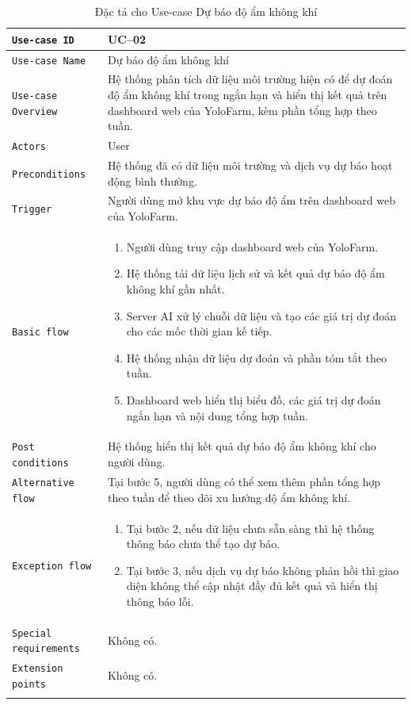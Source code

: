 \begin{longtable}{|P{4.8cm}|m{10cm}|}\hline
	\texttt{Use-case ID} & UC--02\\
	\hline
	\texttt{Use-case Name} & Dự báo độ ẩm không khí\\
	\hline
	\texttt{Use-case Overview} & Hệ thống phân tích dữ liệu môi trường hiện có để dự đoán độ ẩm không khí trong ngắn hạn và hiển thị kết quả trên dashboard web của YoloFarm, kèm phần tổng hợp theo tuần.
	\\
	\hline
	\texttt{Actors} & User
	\\
	\hline
	\texttt{Preconditions} & Hệ thống đã có dữ liệu môi trường và dịch vụ dự báo hoạt động bình thường.
	\\
	\hline
	\texttt{Trigger} & Người dùng mở khu vực dự báo độ ẩm trên dashboard web của YoloFarm.\\
	\hline
	\texttt{Basic flow} &
	\begin{enumerate}
		\item Người dùng truy cập dashboard web của YoloFarm.
		\item Hệ thống tải dữ liệu lịch sử và kết quả dự báo độ ẩm không khí gần nhất.
		\item Server AI xử lý chuỗi dữ liệu và tạo các giá trị dự đoán cho các mốc thời gian kế tiếp.
		\item Hệ thống nhận dữ liệu dự đoán và phần tóm tắt theo tuần.
		\item Dashboard web hiển thị biểu đồ, các giá trị dự đoán ngắn hạn và nội dung tổng hợp tuần.
	\end{enumerate}
	\\
	\hline
	\texttt{Post conditions} &
	Hệ thống hiển thị kết quả dự báo độ ẩm không khí cho người dùng.
	\\
	\hline
	\texttt{Alternative flow} & Tại bước 5, người dùng có thể xem thêm phần tổng hợp theo tuần để theo dõi xu hướng độ ẩm không khí.\\
	\hline
	\texttt{Exception flow} &
	\begin{enumerate}[label = E\arabic*:]
		\item Tại bước 2, nếu dữ liệu chưa sẵn sàng thì hệ thống thông báo chưa thể tạo dự báo.
		\item Tại bước 3, nếu dịch vụ dự báo không phản hồi thì giao diện không thể cập nhật đầy đủ kết quả và hiển thị thông báo lỗi.
	\end{enumerate}
	\\
	\hline
	\texttt{Special requirements} & Không có.\\
	\hline
	\texttt{Extension points} & Không có.\\
	\hline

	\caption{\label{table3}Đặc tả cho Use-case Dự báo độ ẩm không khí}
\end{longtable}
